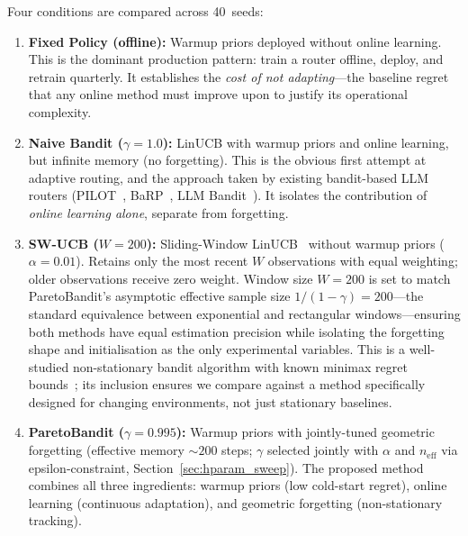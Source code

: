 \noindent
Four conditions are compared across 40~seeds:
\begin{enumerate}[nosep,leftmargin=*]
  \item \textbf{Fixed Policy (offline):}
    Warmup priors deployed without online learning.
    This is the dominant production pattern: train a router offline,
    deploy, and retrain quarterly.
    It establishes the \emph{cost of not adapting}---the baseline
    regret that any online method must improve upon to justify its
    operational complexity.

  \item \textbf{Naive Bandit ($\gamma{=}1.0$):}
    LinUCB with warmup priors and online learning, but
    infinite memory (no forgetting).
    This is the obvious first attempt at adaptive routing, and
    the approach taken by existing bandit-based LLM routers
    (PILOT~\cite{panda2025pilot}, BaRP~\cite{wang2025barp},
    LLM Bandit~\cite{li2025llmbandit}).
    It isolates the contribution of \emph{online learning alone},
    separate from forgetting.

  \item \textbf{SW-UCB ($W{=}200$):}
    Sliding-Window LinUCB~\cite{garivier2011switching} without
    warmup priors ($\alpha{=}0.01$).  Retains only the most
    recent $W$ observations with equal weighting; older
    observations receive zero weight.  Window size $W{=}200$ is set
    to match ParetoBandit's asymptotic effective sample size
    $1/(1{-}\gamma){=}200$---the standard equivalence between
    exponential and rectangular windows---ensuring both methods
    have equal estimation precision while isolating the forgetting
    shape and initialisation as the only experimental variables.
    This is a well-studied non-stationary bandit algorithm with
    known minimax regret bounds~\cite{garivier2011switching}; its
    inclusion ensures we compare against a method specifically
    designed for changing environments, not just stationary
    baselines.

  \item \textbf{ParetoBandit ($\gamma{=}0.995$):}
    Warmup priors with jointly-tuned geometric forgetting
    (effective memory ${\sim}200$ steps; $\gamma$ selected
    jointly with $\alpha$ and $n_{\mathrm{eff}}$ via
    epsilon-constraint, Section~\ref{sec:hparam_sweep}).
    The proposed method combines all three ingredients:
    warmup priors (low cold-start regret), online learning
    (continuous adaptation), and geometric forgetting
    (non-stationary tracking).
\end{enumerate}

